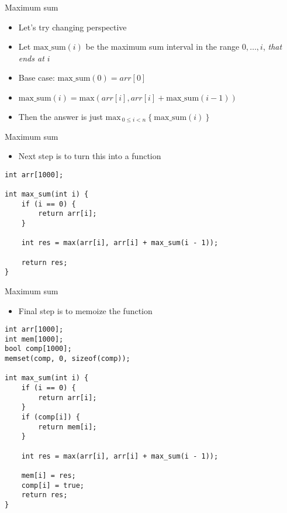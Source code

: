 \documentclass[10pt]{beamer}
\newcommand{\bi}{\begin{itemize}}
\newcommand{\ei}{\end{itemize}}
\begin{document}
\begin{frame}{Maximum sum}

    \vspace{20pt}

    \bi
        \item Let's try changing perspective
        \vspace{5pt}
    \item Let $\mathrm{max\_{}sum}(i)$ be the maximum sum interval in the range $0,\ldots,i$, \textit{that ends at $i$}
        \vspace{5pt}
        \item Base case: $\mathrm{max\_{}sum}(0) = arr[0]$
        \vspace{5pt}
    \item $\mathrm{max\_{}sum}(i) = \mathrm{max}(arr[i], arr[i] + \mathrm{max\_{}sum}(i - 1))$
        \vspace{15pt}
        \item Then the answer is just $\mathrm{max}_{\ 0 \leq i < n}\ \{\ \mathrm{max\_{}sum}(i)\ \}$
    \ei

\end{frame}

\begin{frame}[fragile]{Maximum sum}
    \bi
        \item Next step is to turn this into a function
    \ei

    \begin{verbatim}
int arr[1000];

int max_sum(int i) {
    if (i == 0) {
        return arr[i];
    }

    int res = max(arr[i], arr[i] + max_sum(i - 1));

    return res;
}
    \end{verbatim}
\end{frame}

\begin{frame}[fragile]{Maximum sum}
    \bi
        \item Final step is to memoize the function
    \ei

    \begin{verbatim}
int arr[1000];
int mem[1000];
bool comp[1000];
memset(comp, 0, sizeof(comp));

int max_sum(int i) {
    if (i == 0) {
        return arr[i];
    }
    if (comp[i]) {
        return mem[i];
    }

    int res = max(arr[i], arr[i] + max_sum(i - 1));

    mem[i] = res;
    comp[i] = true;
    return res;
}
    \end{verbatim}
\end{frame}
\end{document}
